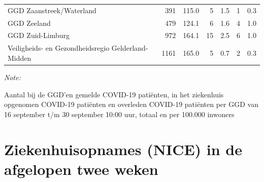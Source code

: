 \documentclass[
  english,
  man,floatsintext]{apa6}
\begin{document}
\begin{table}
\begin{threeparttable}
\begin{tabular}{lrrrrrr}
GGD Zaanstreek/Waterland & 391 & 115.0 & 5 & 1.5 & 1 & 0.3\\
GGD Zeeland & 479 & 124.1 & 6 & 1.6 & 4 & 1.0\\
GGD Zuid-Limburg & 972 & 164.1 & 15 & 2.5 & 6 & 1.0\\
Veiligheids- en Gezondheidsregio Gelderland-Midden & 1161 & 165.0 & 5 & 0.7 & 2 & 0.3\\
\bottomrule
\end{tabular}
\begin{tablenotes}
\item \textit{Note: } 
\item Aantal bij de GGD’en gemelde COVID-19 patiënten, in het ziekenhuis opgenomen COVID-19 patiënten en overleden COVID-19 patiënten per GGD van 16 september t/m 30 september 10:00 uur, totaal en per 100.000 inwoners
\end{tablenotes}
\end{threeparttable}
\endgroup{}
\end{table}

\newpage

\hypertarget{ziekenhuisopnames-nice-in-de-afgelopen-twee-weken}{%
\section{Ziekenhuisopnames (NICE) in de afgelopen twee weken}\label{ziekenhuisopnames-nice-in-de-afgelopen-twee-weken}}
\end{document}

